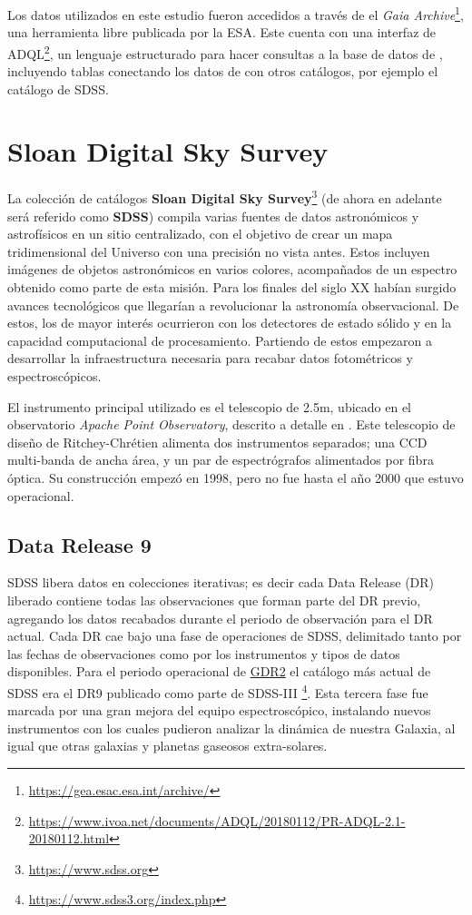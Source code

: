 Los datos utilizados en este estudio fueron accedidos a través de el
\textit{Gaia Archive}\footnote{\url{https://gea.esac.esa.int/archive/}}, una
herramienta libre publicada por la ESA. Este cuenta con una interfaz de
ADQL\footnote{\url{https://www.ivoa.net/documents/ADQL/20180112/PR-ADQL-2.1-20180112.html}},
un lenguaje estructurado para hacer consultas a la base de datos de
\gaiaNoSpace, incluyendo tablas conectando los datos de \gaia con otros
catálogos, por ejemplo el catálogo de SDSS.

\section{Sloan Digital Sky Survey}

La colección de catálogos \textbf{Sloan Digital Sky
Survey}\footnote{\url{https://www.sdss.org}} (de ahora en adelante será referido
como \textbf{SDSS}) compila varias fuentes de datos astronómicos y astrofísicos
en un sitio centralizado, con el objetivo de crear un mapa tridimensional del
Universo con una precisión no vista antes. Estos incluyen imágenes de objetos
astronómicos en varios colores, acompañados de un espectro obtenido como parte
de esta misión. Para los finales del siglo XX habían surgido avances
tecnológicos que llegarían a revolucionar la astronomía observacional. De estos,
los de mayor interés ocurrieron con los detectores de estado sólido y en la
capacidad computacional de procesamiento. Partiendo de estos empezaron a
desarrollar la infraestructura necesaria para recabar datos fotométricos y
espectroscópicos.

El instrumento principal utilizado es el telescopio de 2.5m, ubicado en el
observatorio \textit{Apache Point Observatory}, descrito a detalle en
\autocite{sdss2_5mTelescope}. Este telescopio de diseño de Ritchey-Chrétien
alimenta dos instrumentos separados; una CCD multi-banda de ancha área, y un par
de espectrógrafos alimentados por fibra óptica. Su construcción empezó en 1998,
pero no fue hasta el año 2000 que estuvo operacional.

\subsection{Data Release 9}

SDSS libera datos en colecciones iterativas; es decir cada Data Release (DR)
liberado contiene todas las observaciones que forman parte del DR previo,
agregando los datos recabados durante el periodo de observación para el DR
actual. Cada DR cae bajo una fase de operaciones de SDSS, delimitado tanto por
las fechas de observaciones como por los instrumentos y tipos de datos
disponibles. Para el periodo operacional de
\hyperref[muestra:sec:gaia:dr2]{GDR2} el catálogo más actual de SDSS era el DR9
publicado como parte de SDSS-III
\footnote{\url{https://www.sdss3.org/index.php}}. Esta tercera fase fue marcada
por una gran mejora del equipo espectroscópico, instalando nuevos instrumentos
con los cuales pudieron analizar la dinámica de nuestra Galaxia, al igual que
otras galaxias y planetas gaseosos extra-solares. 

